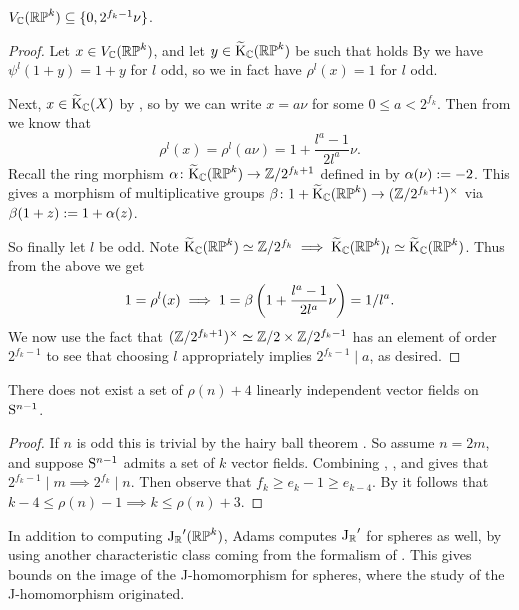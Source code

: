 \begin{lemma}
  \label{RP-jprime}
  $V_\C(\RP^k) \subseteq \{0,2^{f_k-1}\nu\}$.
\end{lemma}

\begin{proof}
  Let $x \in V_\C(\RP^k)$, and let $y \in \wt\K_\C(\RP^k)$ be such
  that  holds By  we have $\psi^l(1+y) =
  1+y$ for $l$ odd, so we in fact have $\rho^l(x) = 1$ for $l$ odd.

  Next, $x \in \wt\K_\C(X)$ by , so by 
  we can write $x = a\nu$ for some $0 \le a < 2^{f_k}$. Then from
   we know that
  \[
  \rho^l(x) = \rho^l(a\nu) = 1 + \frac{l^a-1}{2l^a}\nu.
  \]
  Recall the ring morphism $\alpha \c \wt\K_\C(\RP^k) \to
  \Z/2^{f_k+1}$ defined in  by $\alpha(\nu) \ce
  -2$. This gives a morphism of multiplicative groups $\beta \c 1 +
  \wt\K_\C(\RP^k) \to (\Z/2^{f_k+1})^\times$ via $\beta(1+z) \ce
  1+\alpha(z)$.

  So finally let $l$ be odd. Note $\wt\K_\C(\RP^k) \simeq \Z/2^{f_k}
  \implies \wt\K_\C(\RP^k)_l \simeq \wt\K_\C(\RP^k)$. Thus from the
  above we get
  \[
  1 = \rho^l(x) \implies 1 = \beta\l(1 + \frac{l^a-1}{2l^a}\nu\r) =
  1/l^a.
  \]
  We now use the fact that $(\Z/2^{f_k+1})^\times \simeq \Z/2 \times
  \Z/2^{f_k-1}$ has an element of order $2^{f_k-1}$ to see that
  choosing $l$ appropriately implies $2^{f_k-1} \mid a$, as desired.
\end{proof}

\begin{theorem}
  There does not exist a set of $\rho(n) + 4$ linearly independent
  vector fields on $\S^{n-1}$.
\end{theorem}

\begin{proof}
  If $n$ is odd this is trivial by the hairy ball theorem
  . So assume $n = 2m$, and suppose $\S^{n-1}$ admits
  a set of $k$ vector fields. Combining ,
  , and  gives that $2^{f_k-1} \mid
  m \implies 2^{f_k} \mid n$. Then observe that $f_k \ge e_k - 1 \ge
  e_{k-4}$. By  it follows that $k-4 \le \rho(n) - 1
  \implies k \le \rho(n) + 3$.
\end{proof}

\begin{remark}
  In addition to computing ${\J_\R}'(\RP^k)$, Adams computes
  ${\J_\R}'$ for spheres as well, by using another characteristic
  class coming from the formalism of . This
  gives bounds on the image of the J-homomorphism for spheres, where
  the study of the J-homomorphism originated.
\end{remark}


\nocite{mathew-J, shah-vfields}




